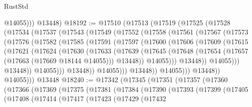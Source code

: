 \begin{lexlean}{RustStd}
\begin{coremodule}
            @14055)))
      @13448)
@18192 := @17510
    (@17513
      (@17519
        (@17525
          (@17528
            (@17534
              (@17537
                (@17543
                  (@17549
                    (@17552
                      (@17558
                        (@17561
                          (@17567
                            (@17573
                              (@17576
                                (@17582
                                  (@17585
                                    (@17591
                                      (@17597
                                        (@17600
                                          (@17606
                                            (@17609
                                              (@17615
                                                (@17621
                                                  (@17624
                                                    (@17630
                                                      (@17633
                                                        (@17639
                                                          (@17645
                                                            (@17648
                                                              (@17654
                                                                (@17657
                                                                  (@17663 (@17669 @18144 @14055)))
                                                                @13448))
                                                            @14055)))
                                                      @13448))
                                                  @14055)))
                                            @13448))
                                        @14055)))
                                  @13448))
                              @14055)))
                        @13448))
                    @14055)))
              @13448))
          @14055)))
    @13448
@18240 := @17342
    (@17345
      (@17351
        (@17357
          (@17360
            (@17366
              (@17369
                (@17375
                  (@17381
                    (@17384
                      (@17390
                        (@17393
                          (@17399
                            (@17405
                              (@17408
                                (@17414
                                  (@17417
                                    (@17423
                                      (@17429
                                        (@17432

\end{coremodule}
\end{lexlean}
